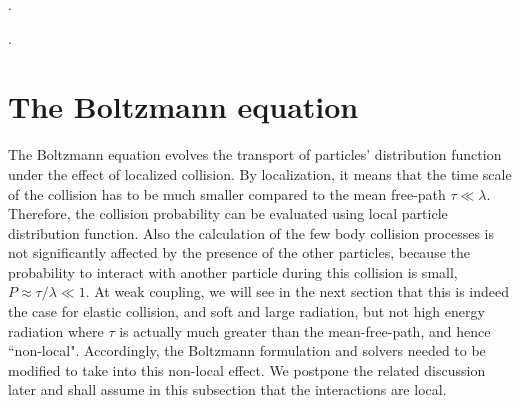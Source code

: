 \cite{PhysRev.103.1811,Wang:1994fx,Zakharov:1996fv,Zakharov:1997uu,Baier:1996kr,Baier:1996sk}

\cite{Cao:2013ita,ColemanSmith:2012vr,Xu:2004mz,Zapp:2011ya,Gossiaux:2012cv,Park:thesis}.

\cite{Arnold:2002zm,Arnold:2008zu,Arnold:2009mr,Baier:1996kr,Baier:1998yf}. 

\section{The Boltzmann equation}
The Boltzmann equation evolves the transport of particles' distribution function under the effect of localized collision. 
By localization, it means that the time scale of the collision has to be much smaller compared to the mean free-path $\tau \ll \lambda$. 
Therefore, the collision probability can be evaluated using local particle distribution function.
Also the calculation of the few body collision processes is not significantly affected by the presence of the other particles, because the probability to interact with another particle during this collision is small, $P \approx \tau/\lambda \ll 1$.
At weak coupling, we will see in the next section that this is indeed the case for elastic collision, and soft and large radiation, but not high energy radiation where $\tau$ is actually much greater than the mean-free-path, and hence ``non-local".
Accordingly, the Boltzmann formulation and solvers needed to be modified to take into this non-local effect.
We postpone the related discussion later and shall assume in this subsection that the interactions are local. 

